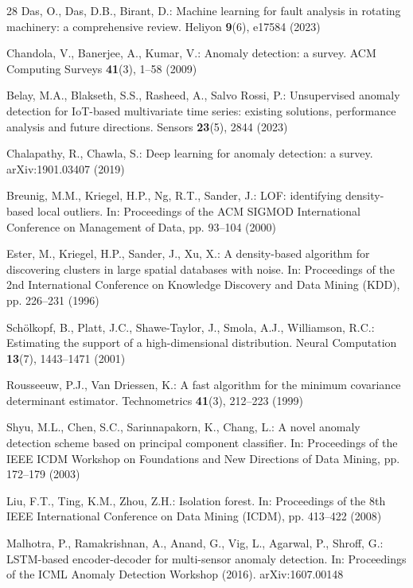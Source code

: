 \documentclass[runningheads]{llncs}
\begin{document}
\begin{thebibliography}{28}
Das, O., Das, D.B., Birant, D.: Machine learning for fault analysis in rotating
machinery: a comprehensive review. Heliyon \textbf{9}(6), e17584 (2023)

Chandola, V., Banerjee, A., Kumar, V.: Anomaly detection: a survey. ACM
Computing Surveys \textbf{41}(3), 1--58 (2009)

Belay, M.A., Blakseth, S.S., Rasheed, A., Salvo Rossi, P.: Unsupervised anomaly
detection for IoT-based multivariate time series: existing solutions,
performance analysis and future directions. Sensors \textbf{23}(5), 2844 (2023)

Chalapathy, R., Chawla, S.: Deep learning for anomaly detection: a survey.
arXiv:1901.03407 (2019)

Breunig, M.M., Kriegel, H.P., Ng, R.T., Sander, J.: LOF: identifying
density-based local outliers. In: Proceedings of the ACM SIGMOD International
Conference on Management of Data, pp. 93--104 (2000)

Ester, M., Kriegel, H.P., Sander, J., Xu, X.: A density-based algorithm for
discovering clusters in large spatial databases with noise. In: Proceedings of
the 2nd International Conference on Knowledge Discovery and Data Mining (KDD),
pp. 226--231 (1996)

Sch\"olkopf, B., Platt, J.C., Shawe-Taylor, J., Smola, A.J., Williamson, R.C.:
Estimating the support of a high-dimensional distribution. Neural Computation
\textbf{13}(7), 1443--1471 (2001)

Rousseeuw, P.J., Van Driessen, K.: A fast algorithm for the minimum covariance
determinant estimator. Technometrics \textbf{41}(3), 212--223 (1999)

Shyu, M.L., Chen, S.C., Sarinnapakorn, K., Chang, L.: A novel anomaly detection
scheme based on principal component classifier. In: Proceedings of the IEEE ICDM
Workshop on Foundations and New Directions of Data Mining, pp. 172--179 (2003)

Liu, F.T., Ting, K.M., Zhou, Z.H.: Isolation forest. In: Proceedings of the 8th
IEEE International Conference on Data Mining (ICDM), pp. 413--422 (2008)

Malhotra, P., Ramakrishnan, A., Anand, G., Vig, L., Agarwal, P., Shroff, G.:
LSTM-based encoder-decoder for multi-sensor anomaly detection. In: Proceedings
of the ICML Anomaly Detection Workshop (2016). arXiv:1607.00148


\end{thebibliography}
\end{document}

